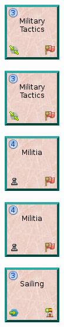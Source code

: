 \documentclass{article}
\begin{document}
\begin{figure}
  \begin{subfigure}{}
    \includegraphics[scale=1]{../rules/png/doe_tech_military_tactics.png}
  \end{subfigure}
  \begin{subfigure}{}
    \includegraphics[scale=1]{../rules/png/doe_tech_military_tactics.png}
  \end{subfigure}
  \begin{subfigure}{}
    \includegraphics[scale=1]{../rules/png/doe_tech_militia.png}
  \end{subfigure}
  \begin{subfigure}{}
    \includegraphics[scale=1]{../rules/png/doe_tech_militia.png}
  \end{subfigure}
  \begin{subfigure}{}
    \includegraphics[scale=1]{../rules/png/doe_tech_sailing.png}
  \end{subfigure}
\end{figure}
\end{document}
